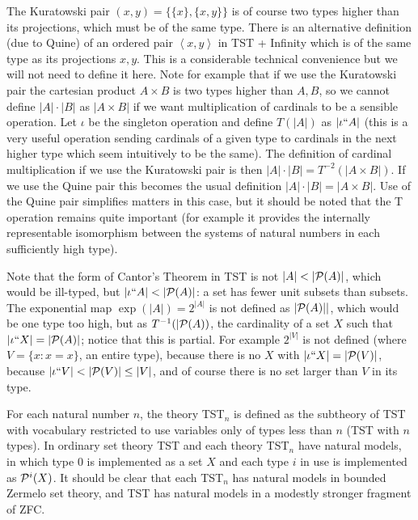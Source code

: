 \documentclass[12pt]{article}
\begin{document}
The Kuratowski pair $(x,y) = \{\{x\},\{x,y\}\}$ is of course two types higher than its projections, which must be of the same type.  There is an alternative definition (due to Quine) of an ordered pair
$\left< x,y\right>$ in TST + Infinity which is of the same type as its projections $x,y$.  This is a considerable technical convenience but we will not need to define it here.  Note for example that if we use the Kuratowski pair the cartesian product $A \times B$ is two types higher than $A,B$, so we cannot define $|A| \cdot |B|$ as $|A \times B|$ if we want multiplication of cardinals to be a sensible operation.  Let $\iota$ be the singleton operation and define $T(|A|)$ as $|\iota``A|$ (this is a very useful operation sending cardinals of a given type to cardinals in the next higher type which seem intuitively to be the same).  The definition of cardinal multiplication if we use the Kuratowski pair is then $|A| \cdot |B| =T^{-2}(|A\times B|)$.  If we use the Quine pair this becomes the usual definition $|A| \cdot |B| =|A\times B|$.  Use of the Quine pair simplifies matters in this case, but it should be noted that the T operation remains quite important (for example it provides the internally representable isomorphism between the systems of natural numbers in each sufficiently high type).

Note that the form of Cantor's Theorem in TST is not $|A| < |{\cal P}(A)|$, which would be ill-typed, but $|\iota``A|<|{\cal P}(A)|$:  a set has fewer unit subsets than subsets.  The exponential map $\exp(|A|) = 2^{|A|}$ is not defined as $|{\cal P}(A)||$, which would be one type too high, but as $T^{-1}(|{\cal P}(A))$, the cardinality of a set $X$ such that $|\iota``X| = |{\cal P}(A)|$;   notice that this is partial.  For example
$2^{|V|}$ is not defined (where $V=\{x:x=x\}$, an entire type), because there is no $X$ with $|\iota``X|=|{\cal P}(V)|$, because $|\iota``V|<|{\cal P}(V)| \leq |V|$, and of course there is no set larger than $V$ in its type.

For each natural number $n$, the theory TST$_n$ is defined as the subtheory of TST with vocabulary restricted to use variables only of types less than $n$ (TST with $n$ types).
In ordinary set theory TST and each theory TST$_n$ have natural models, in which type 0 is implemented as a set $X$ and each type $i$ in use is implemented as ${\cal P}^i(X)$.  It should be clear that each TST$_n$ has natural models in bounded Zermelo set theory, and TST has natural models in a modestly stronger fragment of ZFC.
\end{document}
